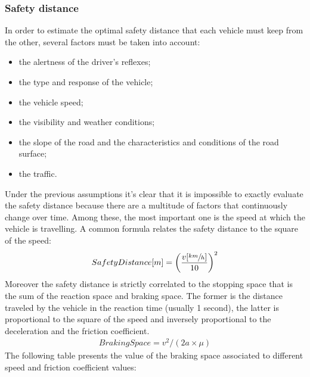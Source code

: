 \subsubsection{Safety distance}
\label{sec:Safety_distance}
In order to estimate the optimal safety distance that each vehicle must keep from the other, several factors must be taken into account:
\begin{itemize}
    \item the alertness of the driver's reflexes;
    \item the type and response of the vehicle;
    \item the vehicle speed;
    \item the visibility and weather conditions;
    \item the slope of the road and the characteristics and conditions of the road surface;
    \item the traffic.
\end{itemize}
Under the previous assumptions it's clear that it is impossible to exactly evaluate the safety distance because there are a multitude of factors that continuously change over time.
Among these, the most important one is the speed at which the vehicle is travelling. A common formula relates the safety distance to the square of the speed:
\begin{align}
   SafetyDistance [m] = \left(\frac{v[\sfrac{km}{h}]}{10}\right)^2
   \label{eq:safetyDistance}
\end{align}
Moreover the safety distance is strictly correlated to the stopping space that is the sum of the reaction space and braking space.
The former is the distance traveled by the vehicle in the reaction time (usually 1 second), the latter is proportional to the square of the speed and inversely proportional to the deceleration and the friction coefficient.
\begin{align}
    BrakingSpace = v^2/(2a \times \mu)
\end{align} 
The following table presents the value of the braking space associated to different speed and friction coefficient values:
